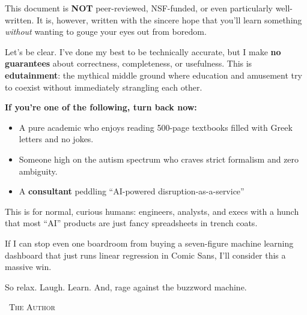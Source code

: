 \begin{tcolorbox}[
    enhanced,
    breakable,
    colback=white,
    colframe=red!70!black,
    coltitle=black,
    boxrule=1pt,
    arc=2mm,
    left=8mm,
    right=8mm,
    top=5mm,
    bottom=5mm,
    sharp corners=south,
    fonttitle=\LARGE\bfseries\sffamily,
    fontupper=\large\sffamily,
    title=\faExclamationTriangle\quad DISCLAIMER: PROCEED WITH CAUTION (AND MAYBE POPCORN)
  ]
  
  \bigskip
  
  This document is \textbf{NOT} peer-reviewed, NSF-funded, or even particularly well-written.  It is, however, written with the sincere hope that you’ll learn something \textit{without} wanting to gouge your eyes out from boredom.

  \medskip
  
  Let’s be clear. I’ve done my best to be technically accurate, but I make \textbf{no guarantees} about correctness, completeness, or usefulness.  This is \textbf{edutainment}: the mythical middle ground where education and amusement try to coexist without immediately strangling each other.

  \medskip
  
  \textbf{\large If you're one of the following, turn back now:}

  \medskip
  
  \begin{itemize}
    \item A pure academic who enjoys reading 500-page textbooks filled with Greek letters and no jokes.
    \item Someone high on the autism spectrum who craves strict formalism and zero ambiguity.
    \item A \textbf{consultant} peddling ``AI-powered disruption-as-a-service'' 
  \end{itemize}

  \medskip
  
  This is for normal, curious humans: engineers, analysts, and execs with a hunch that most “AI” products are just fancy spreadsheets in trench coats.

  \medskip
  
  If I can stop even one boardroom from buying a seven-figure machine learning dashboard that just runs linear regression in Comic Sans, I’ll consider this a massive win.

  \medskip
  
  So relax. Laugh. Learn. And, rage against the buzzword machine.
  
  \bigskip
  
  \hfill\textemdash\ \textsc{The Author}
  
  \end{tcolorbox}
  